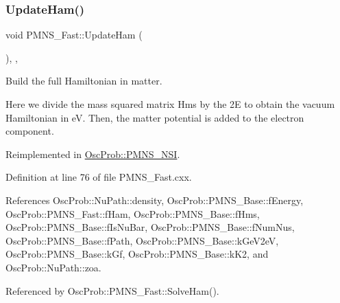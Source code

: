 \mbox{\label{classOscProb_1_1PMNS__Fast_a16248082308f9d2c332ebf1be0aa90c3}} 
\subsubsection{\texorpdfstring{Update\+Ham()}{UpdateHam()}}
{\footnotesize\ttfamily void P\+M\+N\+S\+\_\+\+Fast\+::\+Update\+Ham (\begin{DoxyParamCaption}{ }\end{DoxyParamCaption})\hspace{0.3cm}{\ttfamily [protected]}, {\ttfamily [virtual]}, {\ttfamily [inherited]}}

Build the full Hamiltonian in matter.

Here we divide the mass squared matrix Hms by the 2E to obtain the vacuum Hamiltonian in eV. Then, the matter potential is added to the electron component. 

Reimplemented in \hyperlink{classOscProb_1_1PMNS__NSI_ab5c4f4644fbedb8835f6336c553805ce}{Osc\+Prob\+::\+P\+M\+N\+S\+\_\+\+N\+SI}.



Definition at line 76 of file P\+M\+N\+S\+\_\+\+Fast.\+cxx.



References Osc\+Prob\+::\+Nu\+Path\+::density, Osc\+Prob\+::\+P\+M\+N\+S\+\_\+\+Base\+::f\+Energy, Osc\+Prob\+::\+P\+M\+N\+S\+\_\+\+Fast\+::f\+Ham, Osc\+Prob\+::\+P\+M\+N\+S\+\_\+\+Base\+::f\+Hms, Osc\+Prob\+::\+P\+M\+N\+S\+\_\+\+Base\+::f\+Is\+Nu\+Bar, Osc\+Prob\+::\+P\+M\+N\+S\+\_\+\+Base\+::f\+Num\+Nus, Osc\+Prob\+::\+P\+M\+N\+S\+\_\+\+Base\+::f\+Path, Osc\+Prob\+::\+P\+M\+N\+S\+\_\+\+Base\+::k\+Ge\+V2eV, Osc\+Prob\+::\+P\+M\+N\+S\+\_\+\+Base\+::k\+Gf, Osc\+Prob\+::\+P\+M\+N\+S\+\_\+\+Base\+::k\+K2, and Osc\+Prob\+::\+Nu\+Path\+::zoa.



Referenced by Osc\+Prob\+::\+P\+M\+N\+S\+\_\+\+Fast\+::\+Solve\+Ham().


